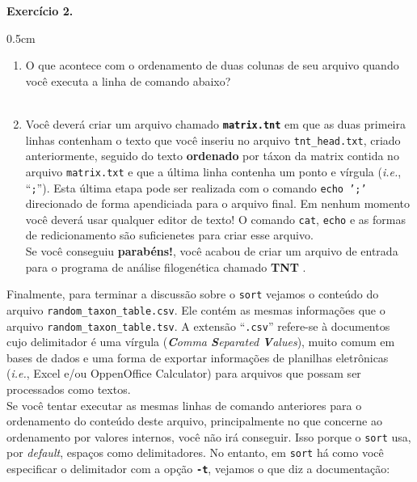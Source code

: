 \begin{refsection}
\begin{blackBlock}{\textbf{Exercício 2.}}
\begin {myindentpar}{0.5cm}
\begin{enumerate}[\itshape i.]
 \item{O que acontece com o ordenamento de duas colunas de seu arquivo quando você executa a linha de comando abaixo?}\label{tut2:text:editors:texttools:sort:ex1}\\
\\

 \item{Você deverá criar um arquivo chamado \textbf{\texttt{matrix.tnt}} em que as duas primeira linhas contenham o texto que você inseriu no arquivo \texttt{tnt\_head.txt}, criado anteriormente, seguido do texto \textbf{ordenado} por táxon da matrix contida no arquivo \texttt{matrix.txt} e que a última linha contenha um ponto e vírgula (\textit{i.e.}, ``\texttt{;}''). Esta última etapa pode ser realizada com o comando \texttt{echo ';'} direcionado de forma apendiciada para o arquivo final. Em nenhum momento você deverá usar qualquer editor de texto! O comando \texttt{cat}, \texttt{echo} e as formas de redicionamento são suficienetes para criar esse arquivo. }\label{tut2:text:editors:texttools:sort:ex3}\\

Se você conseguiu \textbf{parabéns!}, você acabou de criar um arquivo de entrada para o programa de análise filogenética chamado \textbf{TNT} \parencite{GoloboffEtAl_2008}.
	
\end{enumerate}
\end{myindentpar}
\end{blackBlock}


Finalmente, para terminar a discussão sobre o \texttt{sort} vejamos o conteúdo do arquivo \texttt{random\_taxon\_table.csv}. Ele contém as mesmas informações que o arquivo \texttt{random\_taxon\_table.tsv}. A extensão ``\texttt{.csv}'' refere-se à documentos cujo delimitador é uma vírgula (\textit{\textbf{C}omma \textbf{S}eparated \textbf{V}alues}), muito comum em bases de dados e uma forma de exportar informações de planilhas eletrônicas (\textit{i.e.}, Excel e/ou OppenOffice Calculator) para arquivos que possam ser processados como textos.\\

Se você tentar executar as mesmas linhas de comando anteriores para o ordenamento do conteúdo deste arquivo, principalmente no que concerne ao ordenamento por valores internos, você não irá conseguir. Isso porque o \texttt{sort} usa, por \textit{default}, espaços como delimitadores. No entanto, em \texttt{sort} há como você especificar o delimitador com a opção \texttt{\textbf{-t}}, vejamos o que diz a documentação:



\end{refsection}

